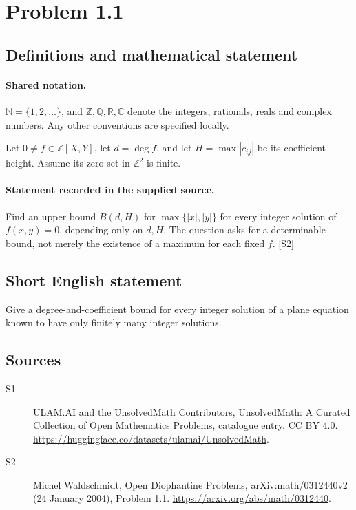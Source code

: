 \documentclass[11pt]{article}
\newcommand{\sref}[2]{\hyperlink{source:#1:#2}{[S#2]}}
\begin{document}
\section{Problem 1.1}\label{statement}

\subsection{Definitions and mathematical statement}

\paragraph{Shared notation.}$\mathbb N=\{1,2,\ldots\}$, and $\mathbb Z,\mathbb Q,\mathbb R,\mathbb C$ denote the integers, rationals, reals and complex numbers. Any other conventions are specified locally.


Let $0\ne f\in\mathbb Z[X,Y]$, let $d=\deg f$, and let $H=\max|c_{ij}|$ be its coefficient height. Assume its zero set in $\mathbb Z^2$ is finite.
\paragraph{Statement recorded in the supplied source.}
Find an upper bound $B(d,H)$ for $\max\{|x|,|y|\}$ for every integer solution of $f(x,y)=0$, depending only on $d,H$. The question asks for a determinable bound, not merely the existence of a maximum for each fixed $f$. \sref{statement}{2}
\subsection{Short English statement}
Give a degree-and-coefficient bound for every integer solution of a plane equation known to have only finitely many integer solutions.
\subsection{Sources}
\begin{description}
\item[\hypertarget{source:statement:1}{S1}] ULAM.AI and the UnsolvedMath Contributors, UnsolvedMath: A Curated Collection of Open Mathematics Problems, catalogue entry. CC BY 4.0. \url{https://huggingface.co/datasets/ulamai/UnsolvedMath}.
\item[\hypertarget{source:statement:2}{S2}] Michel Waldschmidt, Open Diophantine Problems, arXiv:math/0312440v2 (24 January 2004), Problem 1.1. \url{https://arxiv.org/abs/math/0312440}.
\end{description}
\label{end:statement}
\end{document}
